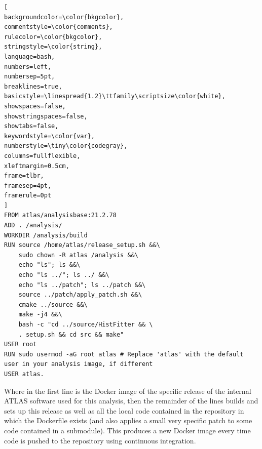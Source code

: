 \begin{lstlisting}[
backgroundcolor=\color{bkgcolor},
commentstyle=\color{comments},
rulecolor=\color{bkgcolor},
stringstyle=\color{string},
language=bash, 
numbers=left, 
numbersep=5pt,
breaklines=true,  
basicstyle=\linespread{1.2}\ttfamily\scriptsize\color{white},  
showspaces=false, 
showstringspaces=false, 
showtabs=false,
keywordstyle=\color{var}, 
numberstyle=\tiny\color{codegray},
columns=fullflexible,
xleftmargin=0.5cm,
frame=tlbr,
framesep=4pt,
framerule=0pt
]
FROM atlas/analysisbase:21.2.78
ADD . /analysis/
WORKDIR /analysis/build
RUN source /home/atlas/release_setup.sh &&\ 
    sudo chown -R atlas /analysis &&\
    echo "ls"; ls &&\
    echo "ls ../"; ls ../ &&\
    echo "ls ../patch"; ls ../patch &&\
    source ../patch/apply_patch.sh &&\
    cmake ../source &&\
    make -j4 &&\ 
    bash -c "cd ../source/HistFitter && \
    . setup.sh && cd src && make"
USER root
RUN sudo usermod -aG root atlas # Replace 'atlas' with the default user in your analysis image, if different
USER atlas. 
\end{lstlisting}

Where in the first line is the Docker image of the specific release of the internal ATLAS software used for this analysis, then the remainder of the lines builds and sets up this release as well as all the local code contained in the repository in which the Dockerfile exists (and also applies a small very specific patch to some code contained in a submodule).
This produces a new Docker image every time code is pushed to the repository using continuous integration.

